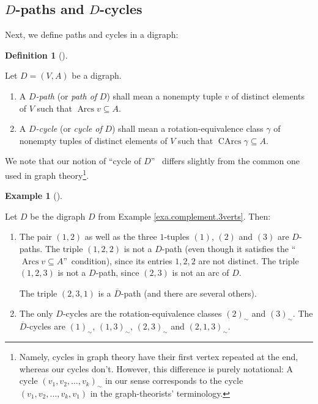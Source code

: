 \documentclass[numbers=enddot,12pt,final,onecolumn,notitlepage]{scrartcl}%
\numberwithin{exer}{section}
\theoremstyle{definition}
\newtheorem{defi}[theo]{Definition}
\newenvironment{definition}[1][]
{\begin{defi}[#1]\begin{leftbar}}
{\end{leftbar}\end{defi}}
\newtheorem{exam}[theo]{Example}
\newenvironment{example}[1][]
{\begin{exam}[#1]\begin{leftbar}}
{\end{leftbar}\end{exam}}
\begin{document}
\subsection{$D$-paths and $D$-cycles}

Next, we define paths and cycles in a digraph:

\begin{definition}
Let $D=\left(  V,A\right)  $ be a digraph.

\begin{enumerate}
\item[\textbf{(a)}] A $D$\emph{-path} (or \emph{path of }$D$) shall mean a
nonempty tuple $v$ of distinct elements of $V$ such that $\operatorname*{Arcs}%
v\subseteq A$.

\item[\textbf{(b)}] A $D$\emph{-cycle} (or \emph{cycle of }$D$) shall mean a
rotation-equivalence class $\gamma$ of nonempty tuples of distinct elements of
$V$ such that $\operatorname*{CArcs}\gamma\subseteq A$.
\end{enumerate}
\end{definition}

We note that our notion of \textquotedblleft cycle of $D$\textquotedblright%
\ differs slightly from the common one used in graph theory\footnote{Namely,
cycles in graph theory have their first vertex repeated at the end, whereas
our cycles don't. However, this difference is purely notational: A cycle
$\left(  v_{1},v_{2},\ldots,v_{k}\right)  _{\sim}$ in our sense corresponds to
the cycle $\left(  v_{1},v_{2},\ldots,v_{k},v_{1}\right)  $ in the
graph-theorists' terminology.}.

\begin{example}
Let $D$ be the digraph $D$ from Example \ref{exa.complement.3verts}. Then:

\begin{enumerate}
\item[\textbf{(a)}] The pair $\left(  1,2\right)  $ as well as the three
$1$-tuples $\left(  1\right)  $, $\left(  2\right)  $ and $\left(  3\right)  $
are $D$-paths. The triple $\left(  1,2,2\right)  $ is not a $D$-path (even
though it satisfies the \textquotedblleft$\operatorname*{Arcs}v\subseteq
A$\textquotedblright\ condition), since its entries $1,2,2$ are not distinct.
The triple $\left(  1,2,3\right)  $ is not a $D$-path, since $\left(
2,3\right)  $ is not an arc of $D$.

The triple $\left(  2,3,1\right)  $ is a $\overline{D}$-path (and there are
several others).

\item[\textbf{(b)}] The only $D$-cycles are the rotation-equivalence classes
$\left(  2\right)  _{\sim}$ and $\left(  3\right)  _{\sim}$. The $\overline
{D}$-cycles are $\left(  1\right)  _{\sim}$, $\left(  1,3\right)  _{\sim}$,
$\left(  2,3\right)  _{\sim}$ and $\left(  2,1,3\right)  _{\sim}$.
\end{enumerate}
\end{example}
\end{document}
